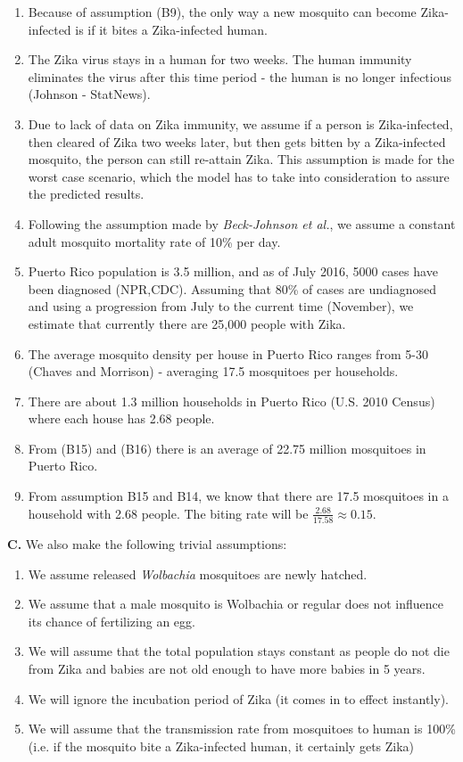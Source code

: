 \documentclass{article}
\begin{document}
\begin{enumerate}
    \item Because of assumption (B9), the only way a new mosquito can become Zika-infected is if it bites a Zika-infected human. 
    \item The Zika virus stays in a human for two weeks. The human immunity eliminates the virus after this time period - the human is no longer infectious (Johnson - StatNews).
    \item Due to lack of data on Zika immunity, we assume if a person is Zika-infected, then cleared of Zika two weeks later, but then gets bitten by a Zika-infected mosquito, the person can still re-attain Zika. This assumption is made for the worst case scenario, which the model has to take into consideration to assure the predicted results.
    \item Following the assumption made by \textit{Beck-Johnson et al.}, we assume a constant adult mosquito mortality rate of 10\% per day.
    \item Puerto Rico population is 3.5 million, and as of July 2016, 5000 cases have been diagnosed (NPR,CDC). Assuming that 80\% of cases are undiagnosed and using a progression from July to the current time (November), we estimate that currently there are 25,000 people with Zika.
    \item The average mosquito density per house in Puerto Rico ranges from 5-30 (Chaves and Morrison) - averaging 17.5 mosquitoes per households.
    \item There are about 1.3 million households in Puerto Rico (U.S. 2010 Census) where each house has 2.68 people.
    \item From (B15) and (B16) there is an average of 22.75 million mosquitoes in Puerto Rico.
    \item From assumption B15 and B14, we know that there are 17.5 mosquitoes in a household with 2.68 people. The biting rate will be $\frac{2.68}{17.58}\approx0.15$.
\end{enumerate}

\textbf{C.} We also make the following trivial assumptions:
\begin{enumerate}
    \item We assume released \textit{Wolbachia} mosquitoes are newly hatched.
    \item We assume that a male mosquito is Wolbachia or regular does not influence its chance of fertilizing an egg.
    \item We will assume that the total population stays constant as people do not die from Zika and babies are not old enough to have more babies in 5 years.
    \item We will ignore the incubation period of Zika (it comes in to effect instantly).
    \item We will assume that the transmission rate from mosquitoes to human is 100\% (i.e. if the mosquito bite a Zika-infected human, it certainly gets Zika)
\end{enumerate}
\end{document}
